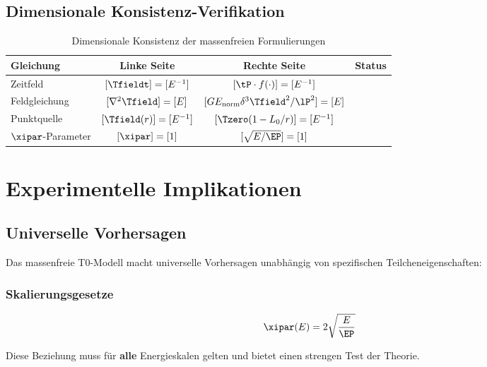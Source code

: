 	\subsection{Dimensionale Konsistenz-Verifikation}
	\label{subsec:dimensional_consistency}
	
	\begin{table}[htbp]
		\centering
		\begin{tabular}{lccl}
			\toprule
			\textbf{Gleichung} & \textbf{Linke Seite} & \textbf{Rechte Seite} & \textbf{Status} \\
			\midrule
			Zeitfeld & $[\Tfieldt] = [E^{-1}]$ & $[\tP \cdot f(\cdot)] = [E^{-1}]$ & \checkmark \\
			Feldgleichung & $[\nabla^2 \Tfield] = [E]$ & $[G E_{\text{norm}} \delta^3 \Tfield^2/\lP^2] = [E]$ & \checkmark \\
			Punktquelle & $[\Tfield(r)] = [E^{-1}]$ & $[\Tzero(1-L_0/r)] = [E^{-1}]$ & \checkmark \\
			$\xipar$-Parameter & $[\xipar] = [1]$ & $[\sqrt{E/\EP}] = [1]$ & \checkmark \\
			\bottomrule
		\end{tabular}
		\caption{Dimensionale Konsistenz der massenfreien Formulierungen}
	\end{table}
	
	\section{Experimentelle Implikationen}
	\label{sec:experimental_implications}
	
	\subsection{Universelle Vorhersagen}
	\label{subsec:universal_predictions}
	
	Das massenfreie T0-Modell macht universelle Vorhersagen unabhängig von spezifischen Teilcheneigenschaften:
	
	\subsubsection{Skalierungsgesetze}
	
	\begin{equation}
		\xipar(E) = 2\sqrt{\frac{E}{\EP}}
		\label{eq:universal_scaling}
	\end{equation}
	
	Diese Beziehung muss für \textbf{alle} Energieskalen gelten und bietet einen strengen Test der Theorie.
	
